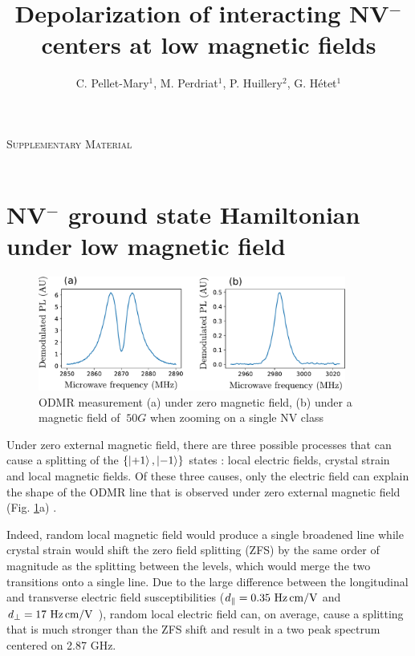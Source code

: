 \documentclass[preprintnumbers,amsmath,amssymb,onecolumn,12pt]{revtex4-2}\usepackage{graphicx}%
\begin{document}
\vspace{0.2in}
{\Large \hspace{1.6in}\textsc{Supplementary Material} }\\
\
\title{Depolarization of interacting NV$^-$ centers at low magnetic fields}

\author{C. Pellet-Mary$^1$, M. Perdriat$^1$, P. Huillery$^2$,  G. H\'etet$^1$} 


\maketitle

\tableofcontents

\section{NV$^-$ ground state Hamiltonian under low magnetic field}
\label{sec Hamiltonian}
\begin{figure}[h]
\includegraphics[width=0.9\textwidth]{Figures_SI/fig_ESR}
\caption{ODMR measurement (a) under zero magnetic field, (b) under a magnetic field of $~ 50 G$ when zooming on a single NV class}
\label{ESR_single_spin}
\end{figure}
Under zero external magnetic field, there are three possible processes that can cause a splitting of the $\{\ket{+1},\ket{-1}\}$ states : local electric fields, crystal strain and local magnetic fields. Of these three causes, only the electric field can explain the shape of the ODMR line that is observed under zero external magnetic field (Fig. \ref{ESR_single_spin}a) \cite{mittiga2018imaging}.

Indeed, random local magnetic field would produce a single broadened line while crystal strain would shift the zero field splitting (ZFS) by the same order of magnitude as the splitting between the levels, which would merge the two transitions onto a single line. Due to the large difference between the longitudinal and transverse electric field susceptibilities ($d_\parallel = 0.35\ \rm Hz\, cm/V$ and $d_\perp = 17\ \rm Hz\, cm/V$ \cite{van1990electric}), random local electric field can, on average, cause a splitting that is much stronger than the ZFS shift and result in a two peak spectrum centered on 2.87 GHz.
\end{document}

